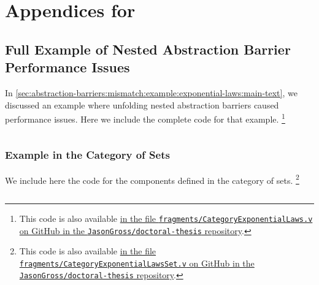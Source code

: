 \chapter{Appendices for }\label{ch:appendix:perf-failures}
\section{Full Example of Nested Abstraction Barrier Performance Issues}\label{sec:abstraction-barriers:mismatch:example:exponential-laws:full-code}

In \autoref{sec:abstraction-barriers:mismatch:example:exponential-laws:main-text}, we discussed an example where unfolding nested abstraction barriers caused performance issues.
Here we include the complete code for that example.%
\footnote{%
  This code is also available \href{https://github.com/JasonGross/doctoral-thesis/blob/master/fragments/CategoryExponentialLaws.v}{in the file \texttt{fragments/CategoryExponentialLaws.v} on GitHub in the \texttt{JasonGross/doctoral-thesis} repository}.
  }


\inputminted{coq}{fragments/CategoryExponentialLaws.v}


\subsection{Example in the Category of Sets}\label{sec:abstraction-barriers:mismatch:example:exponential-laws:full-code:sets}

We include here the code for the components defined in the category of sets.%
\footnote{%
  This code is also available \href{https://github.com/JasonGross/doctoral-thesis/blob/master/fragments/CategoryExponentialLawsSet.v}{in the file \texttt{fragments/CategoryExponentialLawsSet.v} on GitHub in the \texttt{JasonGross/doctoral-thesis} repository}.
  }

\inputminted{coq}{fragments/CategoryExponentialLawsSet.v}
